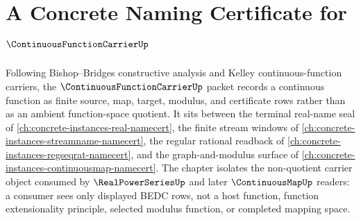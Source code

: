 \chapter{A Concrete Naming Certificate for $\ContinuousFunctionCarrierUp$}
\label{ch:concrete-instances-continuous-function-carrier-namecert}

Following Bishop--Bridges constructive analysis and Kelley continuous-function carriers, the $\ContinuousFunctionCarrierUp$ packet records a continuous function as finite source, map, target, modulus, and certificate rows rather than as an ambient function-space quotient. It sits between the terminal real-name seal of \autoref{ch:concrete-instances-real-namecert}, the finite stream windows of \autoref{ch:concrete-instances-streamname-namecert}, the regular rational readback of \autoref{ch:concrete-instances-regseqrat-namecert}, and the graph-and-modulus surface of \autoref{ch:concrete-instances-continuousmap-namecert}. The chapter isolates the non-quotient carrier object consumed by $\RealPowerSeriesUp$ and later $\ContinuousMapUp$ readers: a consumer sees only displayed BEDC rows, not a host function, function extensionality principle, selected modulus function, or completed mapping space.


